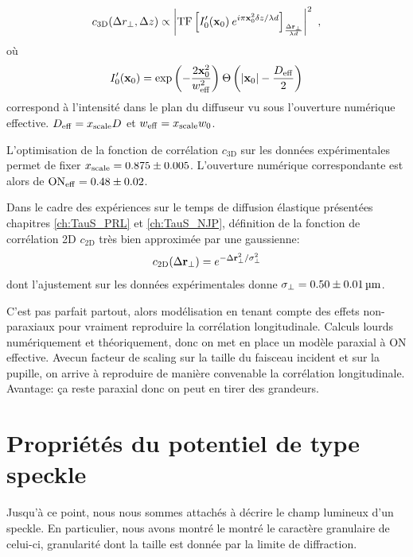 \begin{equation}
c_{\mathrm{3D}}(\Delta r_\perp, \Delta z) \propto \left| \mathrm{TF} \left[ I_0'(\mathbf{x}_0) \: e^{i \pi \mathbf{x}_0^2 \delta z /\lambda d} \right]_{\frac{\Delta \mathbf{r}_\perp}{\lambda d}} \right|^2 \text{ ,}
\end{equation}
où 
\begin{equation}
I_0'(\mathbf{x}_0)= \exp{\left( -\frac{2 \mathbf{x}_0^2}{w_{\mathrm{eff}}^2} \right)} \: \Theta \left( \left| \mathbf{x}_0 \right|- \frac{D_{\mathrm{eff}}}{2} \right)
\end{equation}
correspond à l'intensité dans le plan du diffuseur vu sous l'ouverture numérique effective. $D_{\mathrm{eff}}=x_{\mathrm{scale}} D$ et $w_{\mathrm{eff}}=x_{\mathrm{scale}} w_0$.

L'optimisation de la fonction de corrélation $c_{\mathrm{3D}}$ sur les données expérimentales permet de fixer $x_{\mathrm{scale}}=0.875\pm0.005$. L'ouverture numérique correspondante est alors de $\mathrm{ON}_{\mathrm{eff}}=0.48\pm0.02$.





Dans le cadre des expériences sur le temps de diffusion élastique présentées chapitres \ref{ch:TauS_PRL} et \ref{ch:TauS_NJP}, définition de la fonction de corrélation 2D $c_{\mathrm{2D}}$ très bien approximée par une gaussienne:
\begin{equation}
c_{\mathrm{2D}}(\Delta \mathbf{r}_\perp)=e^{-\Delta \mathbf{r}^2_\perp / \sigma_{\perp}^2}
\end{equation}
dont l'ajustement sur les données expérimentales donne $\sigma_{\perp}=0.50\pm\SI{0.01}{\micro\metre}$.







C'est pas parfait partout, alors modélisation en tenant compte des effets non-paraxiaux pour vraiment reproduire la corrélation longitudinale. Calculs lourds numériquement et théoriquement, donc on met en place un modèle paraxial à ON effective. Avecun facteur de scaling sur la taille du faisceau incident et sur la pupille, on arrive à reproduire de manière convenable la corrélation longitudinale. Avantage: ça reste paraxial donc on peut en tirer des grandeurs. 






\section{Propriétés du potentiel de type speckle}
\label{sc:potentiel_speckle}
Jusqu'à ce point, nous nous sommes attachés à décrire le champ lumineux d'un speckle. En particulier, nous avons montré le montré le caractère granulaire de celui-ci, granularité dont la taille est donnée par la limite de diffraction. 

